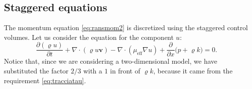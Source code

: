 \subsection{Staggered equations}
The momentum equation \eqref{eq:ransmom2} is discretized using the staggered 
control volumes. Let us consider the equation for the component $u$:
\begin{equation}
\frac{\partial{(\varrho u)}}{\partial t} + \nabla \cdot (\varrho u 
\mathbf{v}) - \nabla \cdot (\mu_\text{eff} \nabla u) + 
\frac{\partial}{\partial x} \big(p + \varrho k\big) = 0.
\end{equation}
Notice that, since we are considering a two-dimensional model, we have 
substituted the factor $2/3$ with a $1$ in front of $\varrho k$, because it 
came from the requirement \eqref{eq:tracciatau}.

